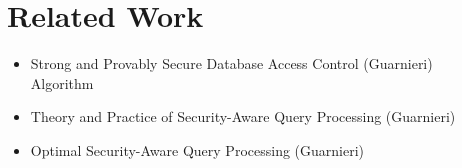 \section{Related Work}

\begin{itemize}
	\item Strong and Provably Secure Database Access Control (Guarnieri) \\
	Algorithm
	\item Theory and Practice of Security-Aware Query Processing (Guarnieri) 
	\item Optimal Security-Aware Query Processing (Guarnieri)
\end{itemize}